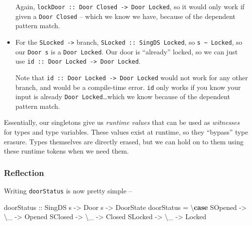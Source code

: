 \documentclass[]{article}
\newenvironment{Shaded}{}{}
\newcommand{\KeywordTok}[1]{\textcolor[rgb]{0.00,0.44,0.13}{\textbf{#1}}}
\newcommand{\DataTypeTok}[1]{\textcolor[rgb]{0.56,0.13,0.00}{#1}}
\newcommand{\OtherTok}[1]{\textcolor[rgb]{0.00,0.44,0.13}{#1}}
\newcommand{\FunctionTok}[1]{\textcolor[rgb]{0.02,0.16,0.49}{#1}}
\newcommand{\NormalTok}[1]{#1}
\begin{document}
\begin{itemize}
  Again,
  \texttt{lockDoor\ ::\ Door\ \textquotesingle{}Closed\ -\textgreater{}\ Door\ \textquotesingle{}Locked},
  so it would only work if given a \texttt{Door\ \textquotesingle{}Closed} --
  which we know we have, because of the dependent pattern match.
\item
  For the \texttt{SLocked\ -\textgreater{}} branch,
  \texttt{SLocked\ ::\ SingDS\ \textquotesingle{}Locked}, so
  \texttt{s\ \textasciitilde{}\ \textquotesingle{}Locked}, so our
  \texttt{Door\ s} is a \texttt{Door\ \textquotesingle{}Locked}. Our door is
  ``already'' locked, so we can just use
  \texttt{id\ ::\ Door\ \textquotesingle{}Locked\ -\textgreater{}\ Door\ \textquotesingle{}Locked}.

  Note that
  \texttt{id\ ::\ Door\ \textquotesingle{}Locked\ -\textgreater{}\ Door\ \textquotesingle{}Locked}
  would not work for any other branch, and would be a compile-time error.
  \texttt{id} only works if you know your input is already
  \texttt{Door\ \textquotesingle{}Locked}\ldots{}which we know because of the
  dependent pattern match.
\end{itemize}

Essentially, our singletons give us \emph{runtime values} that can be used as
\emph{witnesses} for types and type variables. These values exist at runtime, so
they ``bypass'' type erasure. Types themselves are directly erased, but we can
hold on to them using these runtime tokens when we need them.

\subsubsection{Reflection}\label{reflection}

Writing \texttt{doorStatus} is now pretty simple --

\begin{Shaded}
\begin{Highlighting}[]
\OtherTok{doorStatus ::} \DataTypeTok{SingDS}\NormalTok{ s }\OtherTok{->} \DataTypeTok{Door}\NormalTok{ s }\OtherTok{->} \DataTypeTok{DoorState}
\NormalTok{doorStatus }\FunctionTok{=}\NormalTok{ \textbackslash{}}\KeywordTok{case}
    \DataTypeTok{SOpened} \OtherTok{->}\NormalTok{ \textbackslash{}_ }\OtherTok{->} \DataTypeTok{Opened}
    \DataTypeTok{SClosed} \OtherTok{->}\NormalTok{ \textbackslash{}_ }\OtherTok{->} \DataTypeTok{Closed}
    \DataTypeTok{SLocked} \OtherTok{->}\NormalTok{ \textbackslash{}_ }\OtherTok{->} \DataTypeTok{Locked}
\end{Highlighting}
\end{Shaded}
\end{document}
